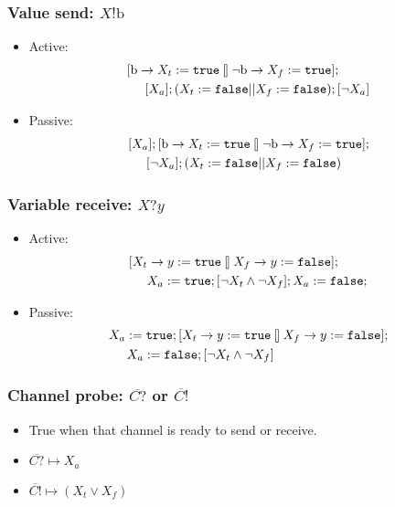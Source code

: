 \documentclass[compress]{beamer}
\begin{document}
\begin{frame}
\frametitle{Value send: $X!\textrm{b}$}
\begin{itemize}
\item Active:
\begin{align*}
    & [\textrm{b} \rightarrow X_t := \texttt{true} \talloblong
     \lnot \textrm{b} \rightarrow X_f := \texttt{true}]; \\
    & \hspace{.5cm} [X_a]; (X_t := \texttt{false} || X_f := \texttt{false}); [\lnot X_a]
\end{align*}

\item Passive:
\begin{align*}
    & [X_a]; [\textrm{b} \rightarrow X_t := \texttt{true} \talloblong
       \lnot \textrm{b} \rightarrow X_f := \texttt{true} ]; \\
    & \hspace{.5cm} [\lnot X_a]; (X_t := \texttt{false} || X_f := \texttt{false})
\end{align*}
\end{itemize}
\end{frame}

\begin{frame}
\frametitle{Variable receive: $X?y$}
\begin{itemize}
\item Active:
\begin{align*}
    & [X_t \rightarrow y := \texttt{true} \talloblong
       X_f \rightarrow y := \texttt{false}]; \\
    & \hspace{.5cm} X_a := \texttt{true};
      [\lnot X_t \land \lnot X_f];
      X_a := \texttt{false};
\end{align*}

\item Passive:
\begin{align*}
    & X_a := \texttt{true};
     [X_t \rightarrow y := \texttt{true} \talloblong
      X_f \rightarrow y := \texttt{false}]; \\
    & \hspace{.5cm} X_a := \texttt{false};
      [\lnot X_t \land \lnot X_f]
\end{align*}
\end{itemize}
\end{frame}

\begin{frame}
\frametitle{Channel probe: $\overline{C?}$ or $\overline{C!}$}
\begin{itemize}
\item True when that channel is ready to send or receive.
\item $\overline{C?} \mapsto X_a$
\item $\overline{C!} \mapsto (X_t \lor X_f)$
\end{itemize}
\end{frame}
\end{document}
